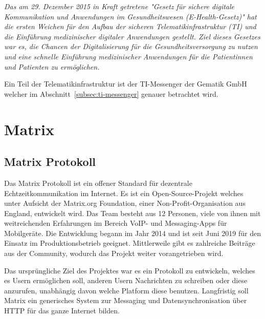     \textit{Das am 29. Dezember 2015 in Kraft getretene "Gesetz für sichere digitale Kommunikation und Anwendungen im Gesundheitswesen (E-Health-Gesetz)" hat die ersten Weichen für den Aufbau der sicheren Telematikinfrastruktur (TI) und die Einführung medizinischer digitaler Anwendungen gestellt.
    Ziel dieses Gesetzes war es, die Chancen der Digitalisierung für die Gesundheitsversorgung zu nutzen und eine schnelle Einführung medizinischer Anwendungen für die Patientinnen und Patienten zu ermöglichen.}~\cite{ehealthgesetz}

    Ein Teil der Telematikinfrastruktur ist der TI-Messenger der Gematik GmbH welcher im Abschnitt~\ref{subsec:ti-messenger} genauer betrachtet wird.

    \newpage
    \section{Matrix}\label{sec:matrix}

    \subsection{Matrix Protokoll}\label{subsec:matrix-protokoll}
    Das Matrix Protokoll ist ein offener Standard für dezentrale Echtzeitkommunikation im Internet.
    Es ist ein Open-Source-Projekt welches unter Aufsicht der Matrix.org Foundation, einer Non-Profit-Organisation aus England, entwickelt wird.
    Das Team besteht aus 12 Personen, viele von ihnen mit weitreichenden Erfahrungen im Bereich VoIP- und Messaging-Apps für Mobilgeräte.
    Die Entwicklung begann im Jahr 2014 und ist seit Juni 2019 für den Einsatz im Produktionsbetrieb geeignet.
    Mittlerweile gibt es zahlreiche Beiträge aus der Community, wodurch das Projekt weiter vorangetrieben wird.
    ~\cite{matrixfaq}

    Das ursprüngliche Ziel des Projektes war es ein Protokoll zu entwickeln, welches es Usern ermöglichen soll, anderen Usern Nachrichten zu schreiben oder diese anzurufen, unabhängig davon welche Platform diese benutzen.
    Langfristig soll Matrix ein generisches System zur Messaging und Datensynchronisation über HTTP für das ganze Internet bilden.
    ~\cite{matrixfaq}

